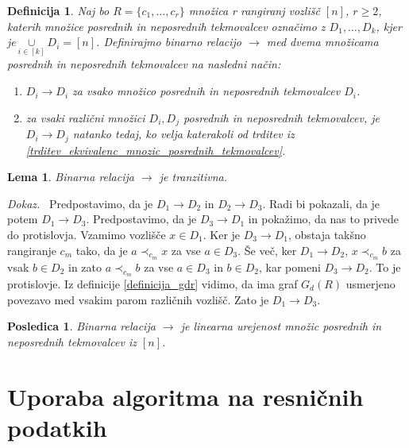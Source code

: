 \documentclass[a4paper, 12pt]{book}
\newtheorem{definicija}{Definicija}[chapter]
\newtheorem{lema}{Lema}[chapter]
\newtheorem{posledica}{Posledica}[chapter]
\newenvironment{dokaz}{\emph{Dokaz.}\ }{\hspace{\fill}{$\Box$}}
\begin{document}
\begin{definicija}
\label{definicija_relacije_mnozic_posrednih_tekmovalcev}
    Naj bo $R = \{ c_1, \dots, c_r \}$ množica r rangiranj vozlišč $[n]$, $r \geq 2$, katerih množice posrednih in neposrednih tekmovalcev označimo z $D_1, \dots, D_k$, kjer je$\underset{i \in [k]}{\cup} D_i = [n]$. Definirajmo binarno relacijo $\rightarrow$ med dvema množicama posrednih in neposrednih tekmovalcev na nasledni način:
    \begin{enumerate}[label=(\roman*)]
        \item $D_i \rightarrow D_i$ za vsako množico posrednih in neposrednih tekmovalcev $D_i$.
        \item za vsaki različni množici $D_i, D_j$ posrednih in neposrednih tekmovalcev, je $D_i \rightarrow D_j$ natanko tedaj, ko velja katerakoli od trditev iz \ref{trditev_ekvivalenc_mnozic_posrednih_tekmovalcev}.
    \end{enumerate}
\end{definicija}

\begin{lema}
    Binarna relacija $\rightarrow$ je tranzitivna.
\end{lema}
\begin{dokaz}
    Predpostavimo, da je $D_1 \rightarrow D_2$ in $D_2 \rightarrow D_3$. Radi bi pokazali, da je potem $D_1 \rightarrow D_3$. Predpostavimo, da je $D_3 \rightarrow D_1$ in pokažimo, da nas to privede do protislovja. Vzamimo vozlišče $x \in D_1$. Ker je $D_3 \rightarrow D_1$, obstaja takšno rangiranje $c_m$ tako, da je $a \prec_{c_m} x$ za vse $a \in D_3$. Še več, ker $D_1 \rightarrow D_2$, $x \prec_{c_m} b$ za vsak $b \in D_2$ in zato $a \prec_{c_m} b$ za vse $a \in D_3$ in $b \in D_2$, kar pomeni $D_3 \rightarrow D_2$. To je protislovje. Iz definicije \ref{definicija_gdr} vidimo, da ima graf $G_d(R)$ usmerjeno povezavo med vsakim parom različnih vozlišč. Zato je $D_1 \rightarrow D_3$.
\end{dokaz}

\begin{posledica}
    Binarna relacija $\rightarrow$ je linearna urejenost množic posrednih in neposrednih tekmovalcev iz $[n]$.
\end{posledica}


\section{Uporaba algoritma na resničnih podatkih}
\end{document}
